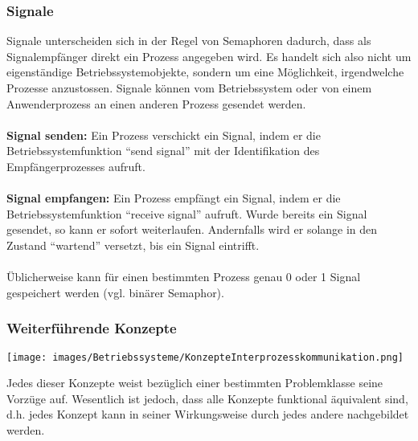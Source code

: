 \clearpage

\subsubsection{Signale}
Signale unterscheiden sich in der Regel von Semaphoren dadurch, dass als
Signalempfänger direkt ein Prozess angegeben wird. Es handelt sich also nicht
um eigenständige Betriebssystemobjekte, sondern um eine Möglichkeit, irgendwelche
Prozesse anzustossen. Signale können vom Betriebssystem oder von einem Anwenderprozess an einen anderen Prozess gesendet werden.\\\\
\textbf{Signal senden:} Ein Prozess verschickt ein Signal, indem er die Betriebssystemfunktion
"`send signal"' mit der Identifikation des Empfängerprozesses aufruft.\\\\
\textbf{Signal empfangen:} Ein Prozess empfängt ein Signal, indem er die Betriebssystemfunktion "`receive signal"' aufruft. Wurde bereits ein Signal gesendet, so kann er sofort
weiterlaufen. Andernfalls wird er solange in den Zustand "`wartend"' versetzt, bis ein Signal eintrifft.\\\\
Üblicherweise kann für einen bestimmten Prozess genau 0 oder 1 Signal
gespeichert werden (vgl. binärer Semaphor).



\subsubsection{Weiterführende Konzepte}
\begin{minipage}{0.4\textwidth}
    \texttt{[image: images/Betriebssysteme/KonzepteInterprozesskommunikation.png]}
\end{minipage}
\hfill
\begin{minipage}{0.6\textwidth}
    Jedes dieser Konzepte weist bezüglich einer bestimmten Problemklasse seine Vorzüge auf. Wesentlich ist jedoch, dass alle Konzepte funktional äquivalent sind, d.h. jedes Konzept kann in seiner Wirkungsweise durch jedes andere nachgebildet werden.
\end{minipage}

